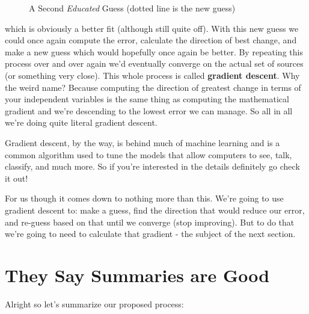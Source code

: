 \documentclass[10pt,a5paper]{book}
\begin{document}
\begin{figure}[!htb]
\caption{\label{fig:my-label} A Second \textit{Educated} Guess (dotted line is the new guess)}
\end{figure}

which is obviously a better fit (although still quite off). With this new guess we could once again compute the error, calculate the direction of best change, and make a new guess which would hopefully once again be better. By repeating this process over and over again we'd eventually converge on the actual set of sources (or something very close). This whole process is called \textbf{gradient descent}. Why the weird name? Because computing the direction of greatest change in terms of your independent variables is the same thing as computing the mathematical gradient and we're descending to the lowest error we can manage. So all in all we're doing quite literal gradient descent. 

Gradient descent, by the way, is behind much of machine learning and is a common algorithm used to tune the models that allow computers to see, talk, classify, and much more. So if you're interested in the details definitely go check it out!

For us though it comes down to nothing more than this. We're going to use gradient descent to: make a guess, find the direction that would reduce our error, and re-guess based on that until we converge (stop improving). But to do that we're going to need to calculate that gradient - the subject of the next section.

\section{They Say Summaries are Good}
Alright so let's summarize our proposed process:
\end{document}

